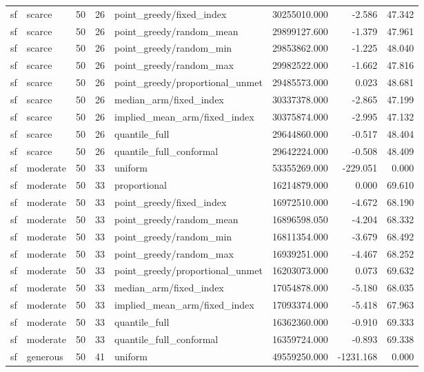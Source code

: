 \begin{tabular}{llrrlrrr}
sf & scarce & 50 & 26 & point\_greedy/fixed\_index & 30255010.000 & -2.586 & 47.342 \\
sf & scarce & 50 & 26 & point\_greedy/random\_mean & 29899127.600 & -1.379 & 47.961 \\
sf & scarce & 50 & 26 & point\_greedy/random\_min & 29853862.000 & -1.225 & 48.040 \\
sf & scarce & 50 & 26 & point\_greedy/random\_max & 29982522.000 & -1.662 & 47.816 \\
sf & scarce & 50 & 26 & point\_greedy/proportional\_unmet & 29485573.000 & 0.023 & 48.681 \\
sf & scarce & 50 & 26 & median\_arm/fixed\_index & 30337378.000 & -2.865 & 47.199 \\
sf & scarce & 50 & 26 & implied\_mean\_arm/fixed\_index & 30375874.000 & -2.995 & 47.132 \\
sf & scarce & 50 & 26 & quantile\_full & 29644860.000 & -0.517 & 48.404 \\
sf & scarce & 50 & 26 & quantile\_full\_conformal & 29642224.000 & -0.508 & 48.409 \\
sf & moderate & 50 & 33 & uniform & 53355269.000 & -229.051 & 0.000 \\
sf & moderate & 50 & 33 & proportional & 16214879.000 & 0.000 & 69.610 \\
sf & moderate & 50 & 33 & point\_greedy/fixed\_index & 16972510.000 & -4.672 & 68.190 \\
sf & moderate & 50 & 33 & point\_greedy/random\_mean & 16896598.050 & -4.204 & 68.332 \\
sf & moderate & 50 & 33 & point\_greedy/random\_min & 16811354.000 & -3.679 & 68.492 \\
sf & moderate & 50 & 33 & point\_greedy/random\_max & 16939251.000 & -4.467 & 68.252 \\
sf & moderate & 50 & 33 & point\_greedy/proportional\_unmet & 16203073.000 & 0.073 & 69.632 \\
sf & moderate & 50 & 33 & median\_arm/fixed\_index & 17054878.000 & -5.180 & 68.035 \\
sf & moderate & 50 & 33 & implied\_mean\_arm/fixed\_index & 17093374.000 & -5.418 & 67.963 \\
sf & moderate & 50 & 33 & quantile\_full & 16362360.000 & -0.910 & 69.333 \\
sf & moderate & 50 & 33 & quantile\_full\_conformal & 16359724.000 & -0.893 & 69.338 \\
sf & generous & 50 & 41 & uniform & 49559250.000 & -1231.168 & 0.000 \\

\end{tabular}
